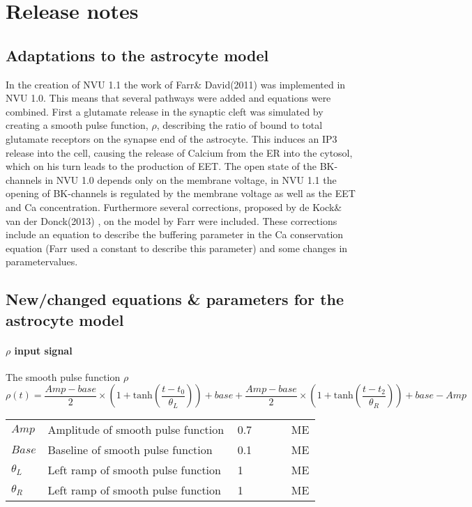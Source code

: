 \section{Release notes}

\subsection{Adaptations to the astrocyte model}
In the creation of NVU 1.1 the work of Farr\& David(2011) \cite{Farr2011} was implemented in NVU 1.0. This means that several pathways were added and equations were combined. First a glutamate release in the synaptic cleft was simulated by creating a smooth pulse function, $\rho$, describing the ratio of bound to total glutamate receptors on the synapse end of the astrocyte. This induces an \gls{IP3} release into the cell, causing the release of Calcium from the \gls{ER} into the cytosol, which on his turn leads to the production of EET. The open state of the BK-channels in NVU 1.0 depends only on the membrane voltage, in NVU 1.1 the opening of BK-channels is regulated by the membrane voltage as well as the EET and \gls{Ca} concentration. Furthermore several corrections, proposed by de Kock\& van der Donck(2013) \cite{LoesEvert}, on the model by Farr were included. These corrections include an equation to describe the buffering parameter in the \gls{Ca} conservation equation (Farr \cite{Farr2011} used a constant to describe this parameter) and some changes in parametervalues.

\subsection{New/changed equations \& parameters for the astrocyte model}
\paragraph{$\rho$ input signal}

The smooth pulse function $\rho$
\begin{equation}
\rho(t) = \frac{Amp - base}{2}\times\left(1+\mathrm{tanh}\left(\frac{t-t_0}{\theta_L}\right)\right)+base+\frac{Amp-base}{2}\times\left(1+\mathrm{tanh}\left(\frac{t-t_2}{\theta_R}\right)\right)+base-Amp     
\end{equation}
%
\begin{table}[h!]
	\centering
	\begin{tabular}{| p{0.09\linewidth} | >{\footnotesize} p{0.6\linewidth} | >{\footnotesize} p{0.17\linewidth} | >{\footnotesize} p{0.02\linewidth} |}
		\arrayrulecolor{lightgrey}\hline
		$Amp$           & Amplitude of smooth pulse function & 0.7 & ME\\
		$Base$          & Baseline of smooth pulse function & 0.1 & ME\\
		$\theta_L$      & Left ramp of smooth pulse function & 1 & ME\\
		$\theta_R$      & Left ramp of smooth pulse function & 1 & ME\\
		\hline
	\end{tabular}
\end{table}

